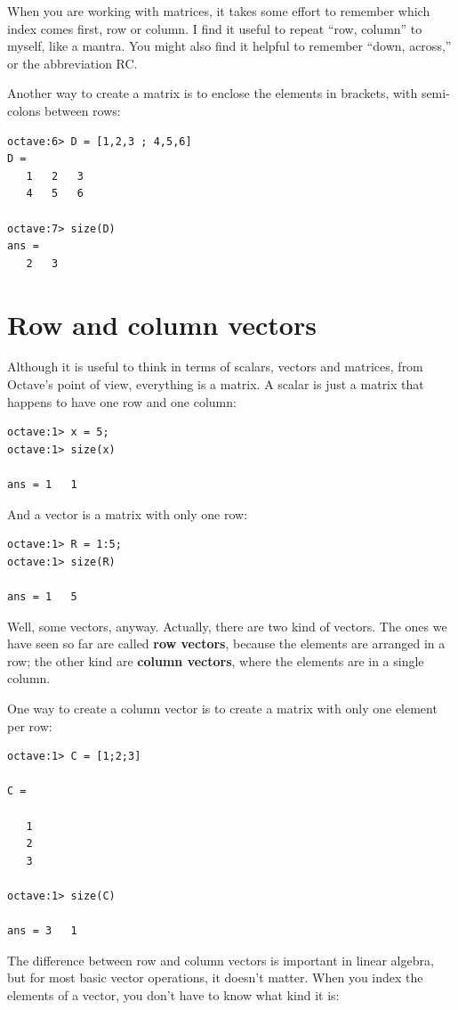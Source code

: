 When you are working with matrices, it takes some effort to remember
which index comes first, row or column. I find it useful to repeat
``row, column'' to myself, like a mantra. You might also find it
helpful to remember ``down, across,'' or the abbreviation RC.

Another way to create a matrix is to enclose the elements in
brackets, with semi-colons between rows:

\begin{verbatim}
octave:6> D = [1,2,3 ; 4,5,6]
D =
   1   2   3
   4   5   6

octave:7> size(D)
ans =
   2   3
\end{verbatim}


\section{Row and column vectors}

Although it is useful to think in terms of scalars, vectors and matrices,
from Octave's point of view, everything is a matrix. A scalar
is just a matrix that happens to have one row and one column:

\begin{verbatim}
octave:1> x = 5;
octave:1> size(x)

ans = 1   1
\end{verbatim}

And a vector is a matrix with only one row:

\begin{verbatim}
octave:1> R = 1:5;
octave:1> size(R)

ans = 1   5
\end{verbatim}

Well, some vectors, anyway. Actually, there are two kind
of vectors. The ones we have seen so far are called {\bf row vectors},
because the elements are arranged in a row; the other kind are
{\bf column vectors}, where the elements are in a single column.

One way to create a column vector is to create a matrix with only
one element per row:

\begin{verbatim}
octave:1> C = [1;2;3]

C =

   1
   2
   3

octave:1> size(C)

ans = 3   1
\end{verbatim}

The difference between row and column vectors is important in
linear algebra, but for
most basic vector operations, it doesn't matter. When you
index the elements of a vector, you don't have to know what kind
it is:

